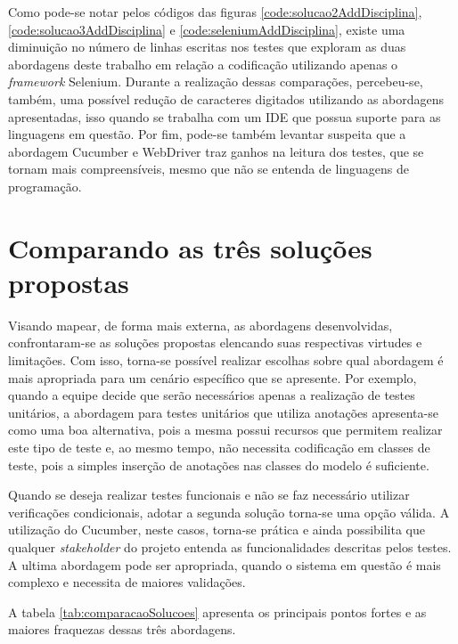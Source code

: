 \documentclass[tg]{mdtufsm}
\begin{document}
Como pode-se notar pelos códigos das figuras \ref{code:solucao2AddDisciplina}, \ref{code:solucao3AddDisciplina} e \ref{code:seleniumAddDisciplina}, existe uma diminuição no número de linhas
escritas nos testes que exploram as duas abordagens deste trabalho em relação a codificação utilizando apenas o \emph{framework} Selenium. Durante a realização dessas comparações, percebeu-se, também, uma possível redução de caracteres digitados utilizando as abordagens apresentadas, isso quando se trabalha com um IDE que possua suporte para as linguagens em questão. Por fim, pode-se também levantar suspeita que a abordagem Cucumber e WebDriver traz ganhos na leitura dos testes, que se tornam mais
compreensíveis, mesmo que não se entenda de linguagens de programação.

\section{Comparando as três soluções propostas}
Visando mapear, de forma mais externa, as abordagens desenvolvidas, confrontaram-se as soluções propostas elencando suas respectivas virtudes e limitações. Com isso, torna-se possível realizar escolhas sobre qual abordagem é mais apropriada para um cenário específico que se apresente.
Por exemplo, quando a equipe decide que serão necessários apenas a realização de testes unitários, a abordagem para testes unitários que utiliza anotações apresenta-se como uma boa alternativa, pois a mesma possui recursos que permitem realizar este tipo de teste e, ao mesmo tempo, não necessita codificação em classes de teste, pois a simples inserção de anotações nas classes do modelo é suficiente.

Quando se deseja realizar testes funcionais e não se faz necessário utilizar verificações condicionais, adotar a segunda solução torna-se uma opção válida. A utilização do Cucumber, neste casos, torna-se prática e ainda possibilita que qualquer \emph{stakeholder} do projeto entenda as funcionalidades descritas pelos testes.
A ultima abordagem pode ser apropriada, quando o sistema em questão é mais complexo e necessita de maiores validações.

A tabela \ref{tab:comparacaoSolucoes} apresenta os principais pontos fortes e as maiores fraquezas dessas três abordagens.
\end{document}
